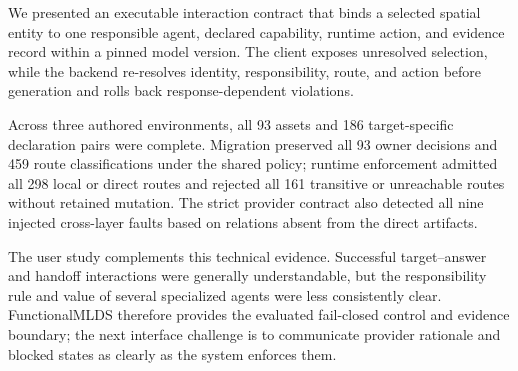 We presented an executable interaction contract that binds a selected spatial
entity to one responsible agent, declared capability, runtime action, and
evidence record within a pinned model version.  The client exposes unresolved
selection, while the backend re-resolves identity, responsibility, route, and
action before generation and rolls back response-dependent violations.

Across three authored environments, all 93 assets and 186 target-specific
declaration pairs were complete.  Migration preserved all 93 owner decisions
and 459 route classifications under the shared policy; runtime enforcement
admitted all 298 local or direct routes and rejected all 161 transitive or
unreachable routes without retained mutation.  The strict provider contract
also detected all nine injected cross-layer faults based on relations absent
from the direct artifacts.

The user study complements this technical evidence.  Successful target--answer
and handoff interactions were generally understandable, but the responsibility
rule and value of several specialized agents were less consistently clear.
FunctionalMLDS therefore provides the evaluated fail-closed control and
evidence boundary; the next interface challenge is to communicate provider
rationale and blocked states as clearly as the system enforces them.
